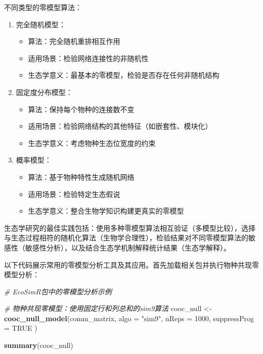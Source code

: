 \documentclass[
  twoside,12pt,fontset=none]{ctexbook}
\newenvironment{Shaded}{\begin{snugshade}}{\end{snugshade}}
\newcommand{\AttributeTok}[1]{\textcolor[rgb]{0.13,0.29,0.53}{#1}}
\newcommand{\CommentTok}[1]{\textcolor[rgb]{0.56,0.35,0.01}{\textit{#1}}}
\newcommand{\ConstantTok}[1]{\textcolor[rgb]{0.56,0.35,0.01}{#1}}
\newcommand{\DecValTok}[1]{\textcolor[rgb]{0.00,0.00,0.81}{#1}}
\newcommand{\FunctionTok}[1]{\textcolor[rgb]{0.13,0.29,0.53}{\textbf{#1}}}
\newcommand{\NormalTok}[1]{#1}
\newcommand{\OtherTok}[1]{\textcolor[rgb]{0.56,0.35,0.01}{#1}}
\newcommand{\StringTok}[1]{\textcolor[rgb]{0.31,0.60,0.02}{#1}}
\providecommand{\tightlist}{%
  \setlength{\itemsep}{0pt}\setlength{\parskip}{0pt}}
\begin{document}
不同类型的零模型算法：

\begin{enumerate}
\def\labelenumi{\arabic{enumi}.}
\tightlist
\item
  完全随机模型：

  \begin{itemize}
  \tightlist
  \item
    算法：完全随机重排相互作用
  \item
    适用场景：检验网络连接性的非随机性
  \item
    生态学意义：最基本的零模型，检验是否存在任何非随机结构
  \end{itemize}
\item
  固定度分布模型：

  \begin{itemize}
  \tightlist
  \item
    算法：保持每个物种的连接数不变
  \item
    适用场景：检验网络结构的其他特征（如嵌套性、模块化）
  \item
    生态学意义：考虑物种生态位宽度的约束
  \end{itemize}
\item
  概率模型：

  \begin{itemize}
  \tightlist
  \item
    算法：基于物种特性生成随机网络
  \item
    适用场景：检验特定生态假说
  \item
    生态学意义：整合生物学知识构建更真实的零模型
  \end{itemize}
\end{enumerate}

生态学研究的最佳实践包括：使用多种零模型算法相互验证（多模型比较），选择与生态过程相符的随机化算法（生物学合理性），检验结果对不同零模型算法的敏感性（敏感性分析），以及结合生态学机制解释统计结果（生态学解释）。

以下代码展示常用的零模型分析工具及其应用。首先加载相关包并执行物种共现零模型分析：

\begin{Shaded}
\begin{Highlighting}[]
\CommentTok{\# EcoSimR包中的零模型分析示例}

\CommentTok{\# 物种共现零模型：使用固定行和列总和的sim9算法}
\NormalTok{cooc\_null }\OtherTok{\textless{}{-}} \FunctionTok{cooc\_null\_model}\NormalTok{(comm\_matrix,}
  \AttributeTok{algo =} \StringTok{"sim9"}\NormalTok{,}
  \AttributeTok{nReps =} \DecValTok{1000}\NormalTok{,}
  \AttributeTok{suppressProg =} \ConstantTok{TRUE}
\NormalTok{)}

\FunctionTok{summary}\NormalTok{(cooc\_null)}
\end{Highlighting}
\end{Shaded}
\end{document}
